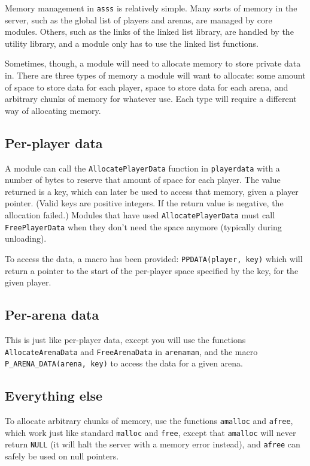 \documentclass{article}
\newcommand{\asss}{\texttt{asss}}
\begin{document}
Memory management in \asss{} is relatively simple. Many sorts of memory
in the server, such as the global list of players and arenas, are
managed by core modules. Others, such as the links of the linked list
library, are handled by the utility library, and a module only has to
use the linked list functions.

Sometimes, though, a module will need to allocate memory to store
private data in. There are three types of memory a module will want to
allocate: some amount of space to store data for each player, space to
store data for each arena, and arbitrary chunks of memory for whatever
use. Each type will require a different way of allocating memory.

\subsection{Per-player data}

A module can call the \verb/AllocatePlayerData/ function in
\verb/playerdata/ with a number of bytes to reserve that amount of space
for each player. The value returned is a key, which can later be used to
access that memory, given a player pointer. (Valid keys are positive
integers. If the return value is negative, the allocation failed.)
Modules that have used \verb/AllocatePlayerData/ must call
\verb/FreePlayerData/ when they don't need the space anymore (typically
during unloading).

To access the data, a macro has been provided: \verb/PPDATA(player, key)/
which will return a pointer to the start of the per-player space
specified by the key, for the given player.


\subsection{Per-arena data}

This is just like per-player data, except you will use the functions
\verb/AllocateArenaData/ and \verb/FreeArenaData/ in \verb/arenaman/,
and the macro \verb/P_ARENA_DATA(arena, key)/ to access the data for a
given arena.

\subsection{Everything else}

To allocate arbitrary chunks of memory, use the functions \verb/amalloc/
and \verb/afree/, which work just like standard \verb/malloc/ and
\verb/free/, except that \verb/amalloc/ will never return \verb/NULL/
(it will halt the server with a memory error instead), and \verb/afree/
can safely be used on null pointers.
\end{document}
